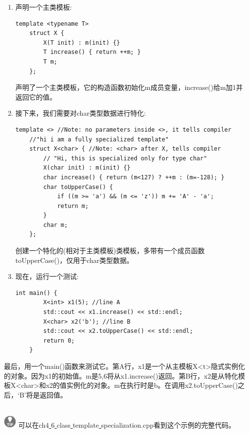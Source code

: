 \begin{enumerate}
	\item 声明一个主类模板: \par
	\begin{lstlisting}[caption={}]
	template <typename T>
	struct X {
		X(T init) : m(init) {}
		T increase() { return ++m; }
		T m;
	};
	\end{lstlisting}
	声明了一个主类模板，它的构造函数初始化m成员变量，increase()给m加1并返回它的值。 \par
	\item 接下来，我们需要对char类型数据进行特化:  \par
	\begin{lstlisting}[caption={}]
	template <> //Note: no parameters inside <>, it tells compiler
	//"hi i am a fully specialized template"
	struct X<char> { //Note: <char> after X, tells compiler
		// "Hi, this is specialized only for type char"
		X(char init) : m(init) {}
		char increase() { return (m<127) ? ++m : (m=-128); }
		char toUpperCase() {
			if ((m >= 'a') && (m <= 'z')) m += 'A' - 'a';
			return m;
		}
		char m;
	};
	\end{lstlisting}
	创建一个特化的(相对于主类模板)类模板，多带有一个成员函数toUpperCase()，仅用于char类型数据。 \par
	\item 现在，运行一个测试:   \par
	\begin{lstlisting}[caption={}]
	int main() {
		X<int> x1(5); //line A
		std::cout << x1.increase() << std::endl;
		X<char> x2('b'); //line B
		std::cout << x2.toUpperCase() << std::endl;
		return 0;
	}
	\end{lstlisting}
\end{enumerate}

最后，用一个main()函数来测试它。第A行，x1是一个从主模板X<t>隐式实例化的对象。因为x1的初始值。m是5,6将从x1.increase()返回。第B行，x2是从特化模板X<char>和x2的值实例化的对象。m在执行时是b。在调用x2.toUpperCase()之后，‘B’将是返回值。 \par

\hspace*{\fill} \\ %
\includegraphics[width=0.05\textwidth]{images/tip}
可以在ch4\underline{ }6\underline{ }class\underline{ }template\underline{ }specialization.cpp看到这个示例的完整代码。 \par
\noindent\textbf{}\ \par

